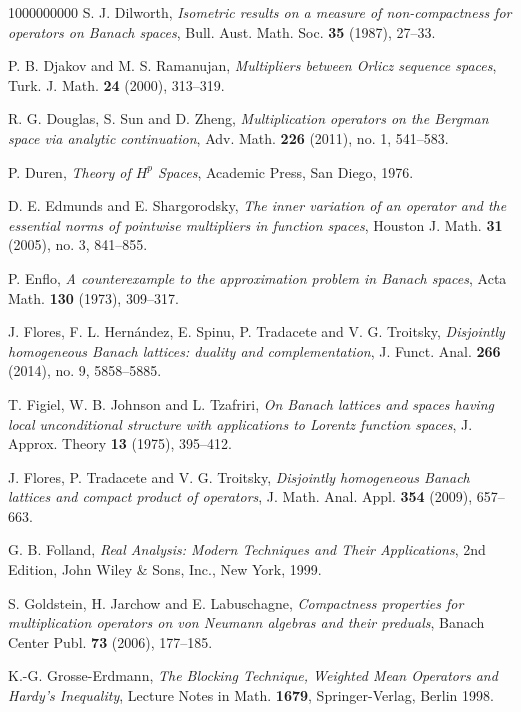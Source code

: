 \documentclass[11pt]{amsart}
\theoremstyle{definition}
\theoremstyle{definition}
\theoremstyle{definition}
\theoremstyle{definition}
\theoremstyle{definition}
\theoremstyle{definition}
\theoremstyle{definition}
\theoremstyle{definition}
\numberwithin{equation}{section}
\numberwithin{equation}{section}
\numberwithin{equation}{section}
\theoremstyle{definition}
\theoremstyle{definition}
\theoremstyle{definition}
\theoremstyle{definition}
\theoremstyle{definition}
\theoremstyle{definition}
\begin{document}
\begin{thebibliography}{1000000000}
	 S. J. Dilworth, {\it Isometric results on a measure of non-compactness for operators on Banach spaces}, Bull. Aust. Math. Soc. {\bf 35} (1987), 27--33.
	
	 P. B. Djakov and M. S. Ramanujan, {\it Multipliers between Orlicz sequence spaces}, Turk. J. Math. {\bf 24} (2000), 313--319.
	
	 R. G. Douglas, S. Sun and D. Zheng, {\it Multiplication operators on the Bergman space via analytic continuation}, Adv. Math. {\bf 226}
		(2011), no. 1, 541--583.
		
	 P. Duren, {\it Theory of $H^p$ Spaces}, Academic Press, San Diego, 1976.
		
	 D. E. Edmunds and E. Shargorodsky, {\it The inner variation of an operator and the essential norms of pointwise multipliers in function spaces},
		Houston J. Math. {\bf 31} (2005), no. 3, 841--855.
		
	 P. Enflo, {\it A counterexample to the approximation problem in Banach spaces}, Acta Math. {\bf 130} (1973), 309--317.
		
	 J. Flores, F. L. Hern{\' a}ndez, E. Spinu, P. Tradacete and V. G. Troitsky, {\it Disjointly homogeneous Banach lattices: duality and complementation},
		J. Funct. Anal. {\bf 266} (2014), no. 9, 5858--5885.
		
	 T. Figiel, W. B. Johnson and L. Tzafriri, {\it On Banach lattices and spaces having local unconditional structure with applications to Lorentz function spaces},
		J. Approx. Theory {\bf 13} (1975), 395--412.
		
	 J. Flores, P. Tradacete and V. G. Troitsky, {\it Disjointly homogeneous Banach lattices and compact product of operators},
		J. Math. Anal. Appl. {\bf 354} (2009), 657--663.
		
	 G. B. Folland, {\it Real Analysis: Modern Techniques and Their Applications}, 2nd Edition, John Wiley \& Sons, Inc., New York, 1999.
	
	 S. Goldstein, H. Jarchow and E. Labuschagne, {\it Compactness properties for multiplication operators on von Neumann algebras and their preduals},
		Banach Center Publ. {\bf 73} (2006), 177--185.
			
	 K.-G. Grosse-Erdmann, {\it The Blocking Technique, Weighted Mean Operators and Hardy's Inequality}, Lecture Notes in Math. {\bf 1679}, Springer-Verlag,
		Berlin 1998.
	

\end{thebibliography}
\end{document}
